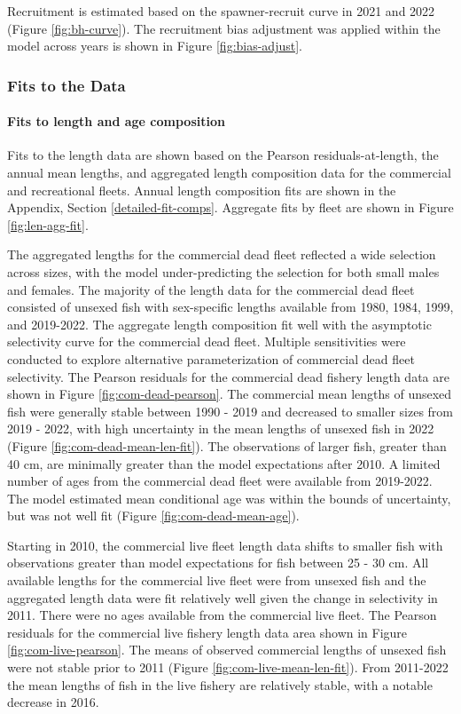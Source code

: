 \documentclass[11pt,
  english,
  letterpaper,
]{article}
\begin{document}
Recruitment is estimated based on the spawner-recruit curve in 2021 and 2022 (Figure \ref{fig:bh-curve}). The recruitment bias adjustment was applied within the model across years is shown in Figure \ref{fig:bias-adjust}.

\hypertarget{fits-to-the-data}{%
\subsubsection{Fits to the Data}\label{fits-to-the-data}}

\hypertarget{fits-to-length-and-age-composition}{%
\paragraph{Fits to length and age composition}\label{fits-to-length-and-age-composition}}

Fits to the length data are shown based on the Pearson residuals-at-length, the annual mean lengths, and aggregated length composition data for the commercial and recreational fleets. Annual length composition fits are shown in the Appendix, Section \ref{detailed-fit-comps}. Aggregate fits by fleet are shown in Figure \ref{fig:len-agg-fit}.

The aggregated lengths for the commercial dead fleet reflected a wide selection across sizes, with the model under-predicting the selection for both small males and females. The majority of the length data for the commercial dead fleet consisted of unsexed fish with sex-specific lengths available from 1980, 1984, 1999, and 2019-2022. The aggregate length composition fit well with the asymptotic selectivity curve for the commercial dead fleet. Multiple sensitivities were conducted to explore alternative parameterization of commercial dead fleet selectivity. The Pearson residuals for the commercial dead fishery length data are shown in Figure \ref{fig:com-dead-pearson}. The commercial mean lengths of unsexed fish were generally stable between 1990 - 2019 and decreased to smaller sizes from 2019 - 2022, with high uncertainty in the mean lengths of unsexed fish in 2022 (Figure \ref{fig:com-dead-mean-len-fit}). The observations of larger fish, greater than 40 cm, are minimally greater than the model expectations after 2010. A limited number of ages from the commercial dead fleet were available from 2019-2022. The model estimated mean conditional age was within the bounds of uncertainty, but was not well fit (Figure \ref{fig:com-dead-mean-age}).

Starting in 2010, the commercial live fleet length data shifts to smaller fish with observations greater than model expectations for fish between 25 - 30 cm. All available lengths for the commercial live fleet were from unsexed fish and the aggregated length data were fit relatively well given the change in selectivity in 2011. There were no ages available from the commercial live fleet. The Pearson residuals for the commercial live fishery length data area shown in Figure \ref{fig:com-live-pearson}. The means of observed commercial lengths of unsexed fish were not stable prior to 2011 (Figure \ref{fig:com-live-mean-len-fit}). From 2011-2022 the mean lengths of fish in the live fishery are relatively stable, with a notable decrease in 2016.
\end{document}
